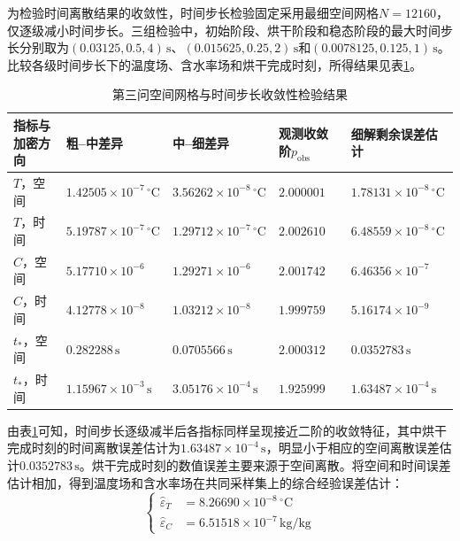 \documentclass[withoutpreface,bwprint]{cumcmthesis}
\begin{document}
为检验时间离散结果的收敛性，时间步长检验固定采用最细空间网格$N=12160$，仅逐级减小时间步长。三组检验中，初始阶段、烘干阶段和稳态阶段的最大时间步长分别取为$(0.03125,0.5,4)\,\mathrm s$、$(0.015625,0.25,2)\,\mathrm s$和$(0.0078125,0.125,1)\,\mathrm s$。比较各级时间步长下的温度场、含水率场和烘干完成时刻，所得结果见表\ref{tab:q3-convergence}。

\begin{table}[H]
\centering
\small
\renewcommand{\arraystretch}{1.15}
\caption{第三问空间网格与时间步长收敛性检验结果}
\label{tab:q3-convergence}
\begin{tabularx}{\textwidth}{>{\centering\arraybackslash}p{} >{\centering\arraybackslash}X >{\centering\arraybackslash}X >{\centering\arraybackslash}p{} >{\centering\arraybackslash}X}
\hline
指标与加密方向 & 粗--中差异 & 中--细差异 & 观测收敛阶$p_{\mathrm{obs}}$ & 细解剩余误差估计\\
\hline
$T$，空间 & $1.42505\times10^{-7}\,{}^\circ\mathrm C$ & $3.56262\times10^{-8}\,{}^\circ\mathrm C$ & $2.000001$ & $1.78131\times10^{-8}\,{}^\circ\mathrm C$\\
$T$，时间 & $5.19787\times10^{-7}\,{}^\circ\mathrm C$ & $1.29712\times10^{-7}\,{}^\circ\mathrm C$ & $2.002610$ & $6.48559\times10^{-8}\,{}^\circ\mathrm C$\\
$C$，空间 & $5.17710\times10^{-6}$ & $1.29271\times10^{-6}$ & $2.001742$ & $6.46356\times10^{-7}$\\
$C$，时间 & $4.12778\times10^{-8}$ & $1.03212\times10^{-8}$ & $1.999759$ & $5.16174\times10^{-9}$\\
$t_*$，空间 & $0.282288\,\mathrm s$ & $0.0705566\,\mathrm s$ & $2.000312$ & $0.0352783\,\mathrm s$\\
$t_*$，时间 & $1.15967\times10^{-3}\,\mathrm s$ & $3.05176\times10^{-4}\,\mathrm s$ & $1.925999$ & $1.63487\times10^{-4}\,\mathrm s$\\
\hline
\end{tabularx}
\end{table}

由表\ref{tab:q3-convergence}可知，时间步长逐级减半后各指标同样呈现接近二阶的收敛特征，其中烘干完成时刻的时间离散误差估计为$1.63487\times10^{-4}\,\mathrm s$，明显小于相应的空间离散误差估计$0.0352783\,\mathrm s$。烘干完成时刻的数值误差主要来源于空间离散。将空间和时间误差估计相加，得到温度场和含水率场在共同采样集上的综合经验误差估计：
\begin{equation}
\left\{
\begin{aligned}
\widehat\varepsilon_T&=8.26690\times10^{-8}\,{}^\circ\mathrm C\\
\widehat\varepsilon_C&=6.51518\times10^{-7}\,\mathrm{kg/kg}
\end{aligned}
\right.
\label{eq:q3-field-error-estimates}
\end{equation}
\end{document}
